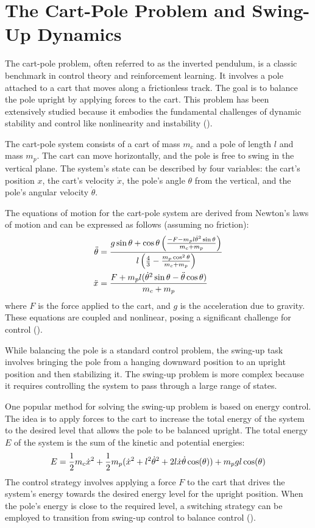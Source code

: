 \section{The Cart-Pole Problem and Swing-Up Dynamics}
The cart-pole problem, often referred to as the inverted pendulum, is a classic benchmark in control theory and reinforcement learning. It involves a pole attached to a cart that moves along a frictionless track. The goal is to balance the pole upright by applying forces to the cart. This problem has been extensively studied because it embodies the fundamental challenges of dynamic stability and control like nonlinearity and instability (). %

The cart-pole system consists of a cart of mass $m_c$ and a pole of length $l$ and mass $m_p$. The cart can move horizontally, and the pole is free to swing in the vertical plane. The system's state can be described by four variables: the cart's position $x$, the cart's velocity $\dot{x}$, the pole's angle $\theta$ from the vertical, and the pole's angular velocity $\dot{\theta}$.

The equations of motion for the cart-pole system are derived from Newton's laws of motion and can be expressed as follows (assuming no friction):
\begin{align}
\ddot{\theta} &= \frac{g\sin\theta + \cos\theta\left(\frac{-F-m_p l \dot{\theta}^2 \sin\theta}{m_c+m_p}\right)}{l\left(\frac{4}{3}-\frac{m_p \cos^2 \theta}{m_c+m_p}\right)} \notag \\
\ddot{x} &= \frac{F+m_p l (\dot{\theta}^2 \sin\theta - \ddot{\theta} \cos\theta)}{m_c+m_p} \notag
\end{align}
where $F$ is the force applied to the cart, and $g$ is the acceleration due to gravity. These equations are coupled and nonlinear, posing a significant challenge for control (\cite{florian_correct_2007}).

While balancing the pole is a standard control problem, the swing-up task involves bringing the pole from a hanging downward position to an upright position and then stabilizing it. The swing-up problem is more complex because it requires controlling the system to pass through a large range of states.

One popular method for solving the swing-up problem is based on energy control. The idea is to apply forces to the cart to increase the total energy of the system to the desired level that allows the pole to be balanced upright. The total energy $E$ of the system is the sum of the kinetic and potential energies:
\begin{align}
E = \frac{1}{2} m_c \dot{x}^2 + \frac{1}{2} m_p (\dot{x}^2 + l^2 \dot{\theta}^2 + 2 l \dot{x} \dot{\theta} \cos(\theta)) + m_p g l \cos(\theta) \notag
\end{align}
The control strategy involves applying a force $F$ to the cart that drives the system's energy towards the desired energy level for the upright position. When the pole's energy is close to the required level, a switching strategy can be employed to transition from swing-up control to balance control (\cite{astrom_swinging_2000}).

